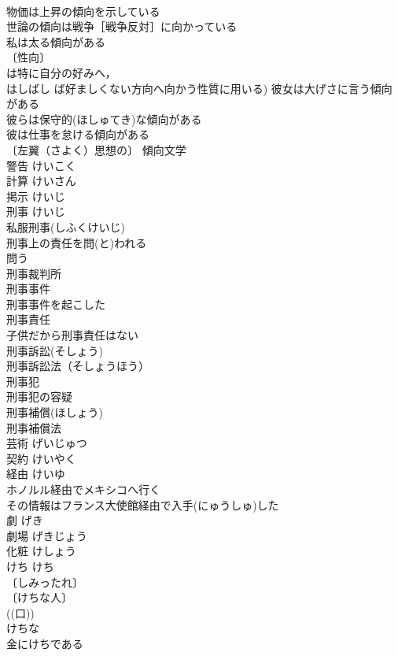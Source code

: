 \documentclass[8pt]{extreport}
\begin{document}
\begin{CJK}{UTF8}{min}
\\	物価は上昇の傾向を示している 
\\	世論の傾向は戦争［戦争反対］に向かっている 
\\	私は太る傾向がある 
\\	〔性向〕
\\	は特に自分の好みへ，
\\	はしばし ば好ましくない方向へ向かう性質に用いる) 彼女は大げさに言う傾向がある 
\\	彼らは保守的(ほしゅてき)な傾向がある 
\\	彼は仕事を怠ける傾向がある 
\\	〔左翼（さよく）思想の〕 傾向文学 
\\	警告	けいこく	
\\	計算	けいさん	
\\	掲示	けいじ	
\\	刑事	けいじ	
\\	私服刑事(しふくけいじ) 
\\	刑事上の責任を問(と)われる 
\\	問う　
\\	刑事裁判所 
\\	刑事事件 
\\	刑事事件を起こした 
\\	刑事責任 
\\	子供だから刑事責任はない 
\\	刑事訴訟(そしょう) 
\\	刑事訴訟法（そしょうほう） 
\\	刑事犯 
\\	刑事犯の容疑 
\\	刑事補償(ほしょう) 
\\	刑事補償法 
\\	芸術	げいじゅつ	
\\	契約	けいやく	
\\	経由	けいゆ	
\\	ホノルル経由でメキシコへ行く 
\\	その情報はフランス大使館経由で入手(にゅうしゅ)した 
\\	劇	げき	
\\	劇場	げきじょう	
\\	化粧	けしょう	
\\	けち	けち	
\\	〔しみったれ〕
\\	〔けちな人〕
\\	((口)) 
\\	けちな 
\\	金にけちである 

\end{CJK}
\end{document}

